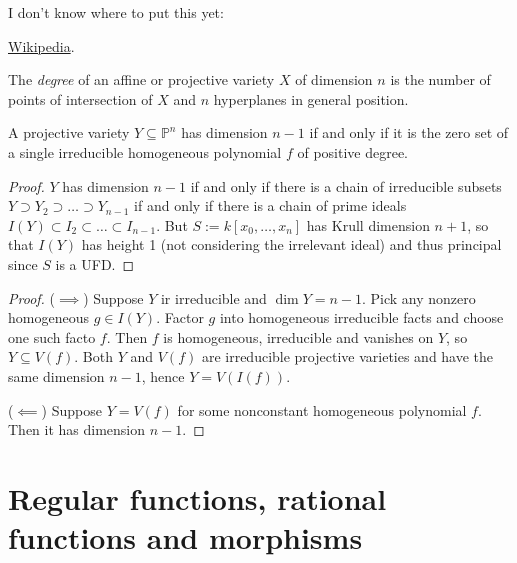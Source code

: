 \medskip\noindent
I don't know where to put this yet:

\begin{definition}
\label{definition-degree}
\begin{reference}
\href{https://en.wikipedia.org/wiki/%
Degree_of_an_algebraic_variety}{Wikipedia}.
\end{reference}
The {\it degree} of an affine or projective
variety $X$ of dimension $n$ is the number of
points
of intersection of $X$ and $n$ hyperplanes in
general position.
\end{definition}

\begin{exercise}
\label{exercise-hypersurfaces-of-pn}
\begin{reference}
\cite[Exercise I.2.8]{hart}
\end{reference}
A projective variety $Y \subseteq
\mathbb{P}^n$
has dimension $n-1$ if and only if
it is the zero set of a single irreducible
homogeneous polynomial
$f$ of positive degree.
\end{exercise}

\begin{proof}
$Y$ has dimension $n-1$ if and only if there
is a chain
of irreducible subsets $Y \supset Y_2\supset…
\supset Y_{n-1}$
if and only if there is a chain of
prime ideals $I(Y) \subset I_2
\subset…\subset I_{n-1}$.
But $S:=k[x_0,…,x_n]$ has Krull dimension
$n+1$,
so that $I(Y)$ has height 1
(not considering the irrelevant ideal) and
thus principal
since $S$ is a UFD.
\end{proof}

\begin{proof}
($\implies$) Suppose $Y$ ir irreducible
and $\dim Y=n-1$. Pick any nonzero
homogeneous $g \in I(Y)$.
Factor $g$ into homogeneous irreducible
facts and choose one such facto $f$.
Then $f$ is homogeneous, irreducible and
vanishes on $Y$,
so $Y \subseteq V(f)$.
Both $Y$ and $V(f)$ are irreducible
projective
varieties and have the same dimension $n-1$,
hence $Y=V(I(f))$.

($\impliedby$) Suppose $Y=V(f)$ for some
nonconstant homogeneous polynomial $f$.
Then it has dimension $n-1$.
\end{proof}

\section{Regular functions, rational
functions and morphisms}
\label{section-regular-functions}

